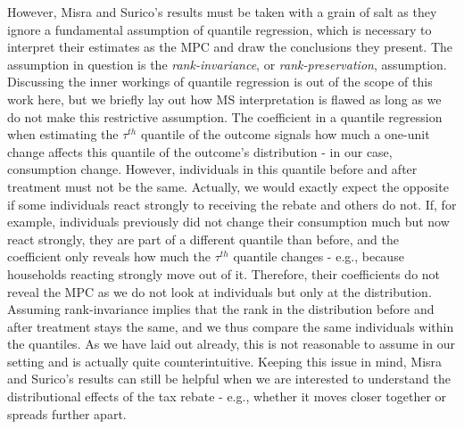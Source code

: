 However, Misra and Surico's results must be taken with a grain of salt as they ignore a fundamental assumption of quantile regression, which is necessary to interpret their estimates as the MPC and draw the conclusions they present. The assumption in question is the \textit{rank-invariance}, or \textit{rank-preservation}, assumption. Discussing the inner workings of quantile regression is out of the scope of this work here, but we briefly lay out how MS interpretation is flawed as long as we do not make this restrictive assumption. The coefficient in a quantile regression when estimating the $\tau^{th}$ quantile of the outcome signals how much a one-unit change affects this quantile of the outcome's distribution - in our case, consumption change. However, individuals in this quantile before and after treatment must not be the same. Actually, we would exactly expect the opposite if some individuals react strongly to receiving the rebate and others do not. If, for example, individuals previously did not change their consumption much but now react strongly, they are part of a different quantile than before, and the coefficient only reveals how much the $\tau^{th}$ quantile changes - e.g., because households reacting strongly move out of it. Therefore, their coefficients do not reveal the MPC as we do not look at individuals but only at the distribution. Assuming rank-invariance implies that the rank in the distribution before and after treatment stays the same, and we thus compare the same individuals within the quantiles. As we have laid out already, this is not reasonable to assume in our setting and is actually quite counterintuitive. Keeping this issue in mind, Misra and Surico's results can still be helpful when we are interested to understand the distributional effects of the tax rebate - e.g., whether it moves closer together or spreads further apart.